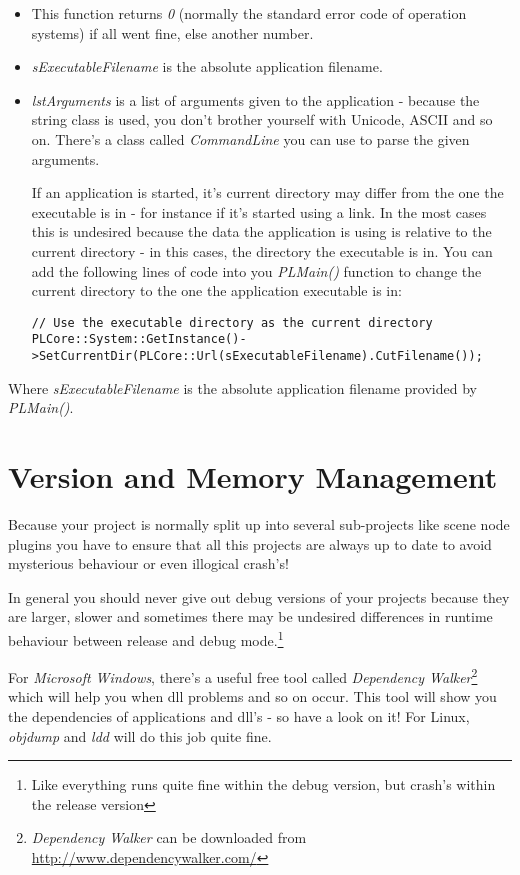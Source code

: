 \begin{itemize}
\item{This function returns \emph{0} (normally the standard error code of operation systems) if all went fine, else another number.}
\item{\emph{sExecutableFilename} is the absolute application filename.}
\item{\emph{lstArguments} is a list of arguments given to the application - because the string class is used, you don't brother yourself with Unicode, ASCII and so on. There's a class called \emph{CommandLine} you can use to parse the given arguments.}

If an application is started, it's current directory may differ from the one the executable is in - for instance if it's started using a link. In the most cases this is undesired because the data the application is using is relative to the current directory - in this cases, the directory the executable is in. You can add the following lines of code into you \emph{PLMain()} function to change the current directory to the one the application executable is in:

\begin{lstlisting}[caption=Set current directory example]
// Use the executable directory as the current directory
PLCore::System::GetInstance()->SetCurrentDir(PLCore::Url(sExecutableFilename).CutFilename());
\end{lstlisting}
\end{itemize}

Where \emph{sExecutableFilename} is the absolute application filename provided by \emph{PLMain()}.




\section{Version and Memory Management}
Because your project is normally split up into several sub-projects like scene node plugins you have to ensure that all this projects are always up to date to avoid mysterious behaviour or even illogical crash's!

In general you should never give out debug versions of your projects because they are larger, slower and sometimes there may be undesired differences in runtime behaviour between release and debug mode.\footnote{Like everything runs quite fine within the debug version, but crash's within the release version}

For \emph{Microsoft Windows}, there's a useful free tool called \emph{Dependency Walker}\footnote{\emph{Dependency Walker} can be downloaded from \url{http://www.dependencywalker.com/}} which will help you when dll problems and so on occur. This tool will show you the dependencies of applications and dll's - so have a look on it! For Linux, \emph{objdump} and \emph{ldd} will do this job quite fine.


